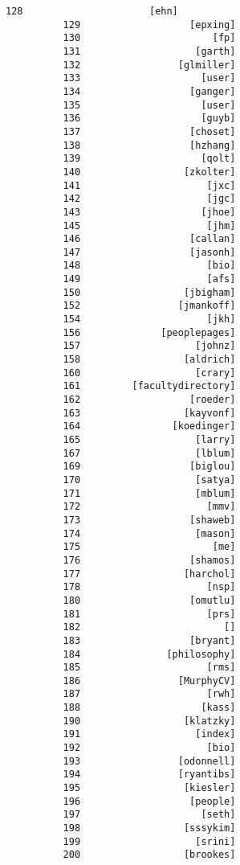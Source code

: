 \documentclass[11pt]{article}
\begin{document}
\begin{Verbatim}[commandchars=\\\{\}]
          128                      [ehn]
          129                   [epxing]
          130                       [fp]
          131                    [garth]
          132                 [glmiller]
          133                     [user]
          134                   [ganger]
          135                     [user]
          136                     [guyb]
          137                   [choset]
          138                   [hzhang]
          139                     [qolt]
          140                  [zkolter]
          141                      [jxc]
          142                      [jgc]
          143                     [jhoe]
          145                      [jhm]
          146                   [callan]
          147                   [jasonh]
          148                      [bio]
          149                      [afs]
          150                  [jbigham]
          152                 [jmankoff]
          154                      [jkh]
          156              [peoplepages]
          157                    [johnz]
          158                  [aldrich]
          160                    [crary]
          161         [facultydirectory]
          162                   [roeder]
          163                  [kayvonf]
          164                [koedinger]
          165                    [larry]
          167                    [lblum]
          169                   [biglou]
          170                    [satya]
          171                    [mblum]
          172                      [mmv]
          173                   [shaweb]
          174                    [mason]
          175                       [me]
          176                   [shamos]
          177                  [harchol]
          178                      [nsp]
          180                   [omutlu]
          181                      [prs]
          182                         []
          183                   [bryant]
          184               [philosophy]
          185                      [rms]
          186                 [MurphyCV]
          187                      [rwh]
          188                     [kass]
          190                  [klatzky]
          191                    [index]
          192                      [bio]
          193                 [odonnell]
          194                 [ryantibs]
          195                  [kiesler]
          196                   [people]
          197                     [seth]
          198                  [sssykim]
          199                    [srini]
          200                  [brookes]

\end{Verbatim}
\end{document}
